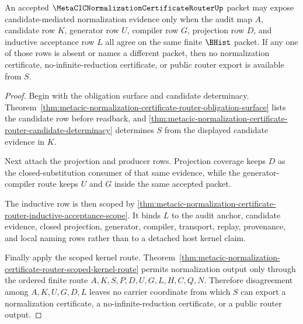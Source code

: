 \begin{theorem}
\label{thm:metacic-normalization-certificate-router-candidate-soundness}
An accepted $\MetaCICNormalizationCertificateRouterUp$ packet may expose candidate-mediated normalization evidence only when the audit map $A$, candidate row $K$, generator row $U$, compiler row $G$, projection row $D$, and inductive acceptance row $L$ all agree on the same finite $\BHist$ packet. If any one of those rows is absent or names a different packet, then no normalization certificate, no-infinite-reduction certificate, or public router export is available from $S$.
\end{theorem}
\begin{proof}
Begin with the obligation surface and candidate determinacy. Theorem~\ref{thm:metacic-normalization-certificate-router-obligation-surface} lists the candidate row before readback, and \autoref{thm:metacic-normalization-certificate-router-candidate-determinacy} determines $S$ from the displayed candidate evidence in $K$.

Next attach the projection and producer rows. Projection coverage keeps $D$ as the closed-substitution consumer of that same evidence, while the generator-compiler route keeps $U$ and $G$ inside the same accepted packet.

The inductive row is then scoped by \autoref{thm:metacic-normalization-certificate-router-inductive-acceptance-scope}. It binds $L$ to the audit anchor, candidate evidence, closed projection, generator, compiler, transport, replay, provenance, and local naming rows rather than to a detached host kernel claim.

Finally apply the scoped kernel route. Theorem~\ref{thm:metacic-normalization-certificate-router-scoped-kernel-route} permits normalization output only through the ordered finite route $A,K,S,P,D,U,G,L,H,C,Q,N$. Therefore disagreement among $A,K,U,G,D,L$ leaves no carrier coordinate from which $S$ can export a normalization certificate, a no-infinite-reduction certificate, or a public router output.
\end{proof}

